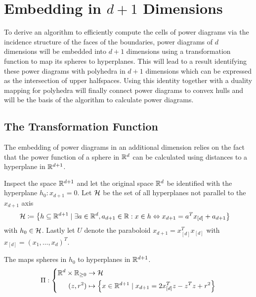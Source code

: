 \section{Embedding in \texorpdfstring{$d+1$}{d+1} Dimensions}
\label{sec:embedding_in_d_1_dimensions}
To derive an algorithm to efficiently compute the cells of power diagrams via the incidence structure of the faces of the boundaries, power diagrams of $d$ dimensions will be embedded into $d+1$ dimensions using a transformation function to map its spheres to hyperplanes.
This will lead to a result identifying these power diagrams with polyhedra in $d+1$ dimensions which can be expressed as the intersection of upper halfspaces.
Using this identity together with a duality mapping for polyhedra will finally connect power diagrams to convex hulls and will be the basis of the algorithm to calculate power diagrams.

\subsection{The Transformation Function}
\label{sub:the_transform}
The embedding of power diagrams in an additional dimension relies on the fact that the power function of a sphere in $\mathbb{R}^d$ can be calculated using distances to a hyperplane in $\mathbb{R}^{d+1}$.

Inspect the space $\mathbb{R}^{d+1}$ and let the original space $\mathbb{R}^d$ be identified with the hyperplane $h_0: x_{d+1} = 0$.
Let $\mathcal{H}$ be the set of all hyperplanes not parallel to the $x_{d+1}$ axis
\begin{align}
    \mathcal{H} &\coloneqq \left\{ h \subseteq \mathbb{R}^{d+1} \mid \exists a \in \mathbb{R}^d, a_{d+1} \in \mathbb{R} : x \in h \Leftrightarrow x_{d+1} = a^Tx_{[d]} + a_{d+1} \right\}
\end{align}
with $h_0 \in \mathcal{H}$.
Lastly let $U$ denote the paraboloid $x_{d+1} = x_{[d]}^Tx_{[d]}$ with $x_{[d]} = \left( x_1, \dots, x_d \right)^T$.

\begin{definition}
    The  maps spheres in $h_0$ to hyperplanes in $\mathbb{R}^{d+1}$.
    \begin{align}
        \Pi: \left\{\begin{aligned}
            \mathbb{R}^{d} \times \mathbb{R}_{\geq 0} &\to \mathcal{H}\\
            (z, r^2) &\mapsto \left\{ x \in \mathbb{R}^{d+1} \mid x_{d+1} = 2x_{[d]}^Tz - z^Tz + r^2 \right\}
        \end{aligned}\right.
    \end{align}
\end{definition}

